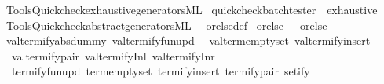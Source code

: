 \begin{isabellebody}
%
\isadelimML
\isanewline
%
\endisadelimML
%
\isatagML
{}\isamarkupfalse%
\ {\isacartoucheopen}Tools{\isacharslash}{\kern0pt}Quickcheck{\isacharslash}{\kern0pt}exhaustive{\isacharunderscore}{\kern0pt}generators{\isachardot}{\kern0pt}ML{\isacartoucheclose}%
\endisatagML
{\isafoldML}%
%
\isadelimML
\isanewline
%
\endisadelimML
\isanewline
{}\isamarkupfalse%
\ {\isacharbrackleft}{\kern0pt}{\isacharbrackleft}{\kern0pt}quickcheck{\isacharunderscore}{\kern0pt}batch{\isacharunderscore}{\kern0pt}tester\ {\isacharequal}{\kern0pt}\ exhaustive{\isacharbrackright}{\kern0pt}{\isacharbrackright}{\kern0pt}%
\isadelimdocument
%
\endisadelimdocument
%
\isatagdocument
%
\isamarkuptrue%
%
\endisatagdocument
{\isafolddocument}%
%
\isadelimdocument
%
\endisadelimdocument
%
\isadelimML
%
\endisadelimML
%
\isatagML
{}\isamarkupfalse%
\ {\isacartoucheopen}Tools{\isacharslash}{\kern0pt}Quickcheck{\isacharslash}{\kern0pt}abstract{\isacharunderscore}{\kern0pt}generators{\isachardot}{\kern0pt}ML{\isacartoucheclose}%
\endisatagML
{\isafoldML}%
%
\isadelimML
%
\endisadelimML
\isanewline
\isanewline
{}\isamarkupfalse%
\ {\isacharparenleft}{\kern0pt}\ orelse{\isacharunderscore}{\kern0pt}def\isanewline
{}\isamarkupfalse%
\ orelse\ \ {\isacharparenleft}{\kern0pt}\ {\isachardoublequoteopen}orelse{\isachardoublequoteclose}\ {}{}{\isacharparenright}{\kern0pt}\isanewline
\isanewline
{}\isamarkupfalse%
\ valtermify{\isacharunderscore}{\kern0pt}absdummy\ valtermify{\isacharunderscore}{\kern0pt}fun{\isacharunderscore}{\kern0pt}upd\isanewline
\ \ valterm{\isacharunderscore}{\kern0pt}emptyset\ valtermify{\isacharunderscore}{\kern0pt}insert\isanewline
\ \ valtermify{\isacharunderscore}{\kern0pt}pair\ valtermify{\isacharunderscore}{\kern0pt}Inl\ valtermify{\isacharunderscore}{\kern0pt}Inr\isanewline
\ \ termify{\isacharunderscore}{\kern0pt}fun{\isacharunderscore}{\kern0pt}upd\ term{\isacharunderscore}{\kern0pt}emptyset\ termify{\isacharunderscore}{\kern0pt}insert\ termify{\isacharunderscore}{\kern0pt}pair\ setify\isanewline
\isanewline
{}\isamarkupfalse%
\ {\isacharparenleft}{\kern0pt}\isanewline

\end{isabellebody}
